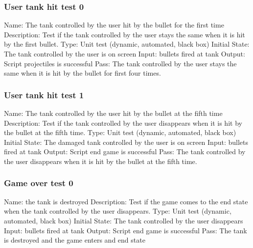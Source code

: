 \documentclass{article}
\begin{document}
\subsubsection{User tank hit test 0}
Name: The tank controlled by the user hit by the bullet for the first time
\newline
Description: Test if the tank controlled by the user stays the same when it is 
hit by the first bullet. \newline
Type: Unit test (dynamic, automated, black box) \newline
Initial State:  The tank controlled by the user is on screen \newline
Input: bullets fired at tank\newline
Output: Script projectiles is successful  \newline
Pass: The tank controlled by the user stays the same when it is hit by the 
bullet for first four times. \newline

\subsubsection{User tank hit test 1}
Name:  The tank controlled by the user hit by the bullet at the fifth time
\newline
Description: Test if the tank controlled by the user disappears when it is hit 
by the bullet at the fifth time. \newline
Type: Unit test (dynamic, automated, black box) \newline
Initial State:  The damaged tank controlled by the user is on screen
 \newline
Input: bullets fired at tank\newline
Output: Script end game is successful\newline
Pass: The tank controlled by the user disappears when it is hit by the bullet 
at the fifth time. \newline

\subsubsection{Game over test 0}
Name:  the tank is destroyed\newline
Description: Test if the game comes to the end state when the tank controlled 
by the user disappears. \newline
Type: Unit test (dynamic, automated, black box) \newline
Initial State:  The tank controlled by the user disappears\newline
Input: bullets fired at tank\newline
Output: Script end game is successful\newline
Pass:  The tank is destroyed and the game enters and end state \newline
\end{document}
